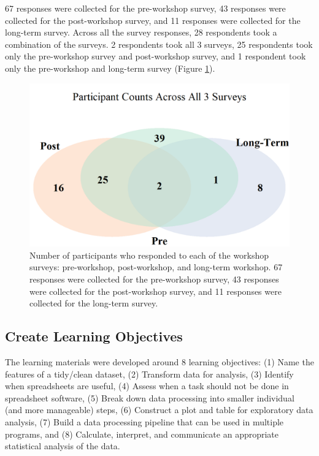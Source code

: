 \documentclass[030-workshop.tex]{subfiles}
\begin{document}
    67 responses were collected for the pre-workshop survey,
    43 responses were collected for the post-workshop survey, and
    11 responses were collected for the long-term survey.
    Across all the survey responses,
    28 respondents took a combination of the surveys.
    2 respondents took all 3 surveys,
    25 respondents took only the pre-workshop survey and post-workshop survey, and
    1 respondent took only the pre-workshop and long-term survey (Figure \ref{fig:pre-post-long-response-counts}).

    \begin{figure}[htb]
        \centering
        \includegraphics[]{figs/030-logitudinal/pre-post-long-response-counts}
        \caption[Response rates across all surveys (pre, post, long-term)]
        {Number of participants who responded to each of the workshop surveys:
         pre-workshop, post-workshop, and long-term workshop.
         67 responses were collected for the pre-workshop survey,
         43 responses were collected for the post-workshop survey, and
         11 responses were collected for the long-term survey.
        }
        \label{fig:pre-post-long-response-counts}
    \end{figure}

    \subsection{Create Learning Objectives}

        The learning materials were developed around 8 learning objectives:
        (1) Name the features of a tidy/clean dataset,
        (2) Transform data for analysis,
        (3) Identify when spreadsheets are useful,
        (4) Assess when a task should not be done in spreadsheet software,
        (5) Break down data processing into smaller individual (and more manageable) steps,
        (6) Construct a plot and table for exploratory data analysis,
        (7) Build a data processing pipeline that can be used in multiple programs, and
        (8) Calculate, interpret, and communicate an appropriate statistical analysis of the data.
\end{document}

